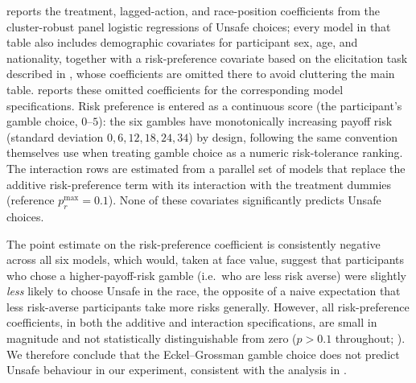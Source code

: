 \documentclass[pdflatex,sn-mathphys-ay]{sn-jnl}
\theoremstyle{thmstyleone}
\theoremstyle{thmstyletwo}
\theoremstyle{thmstylethree}
\begin{document}
 reports the treatment, lagged-action, and race-position coefficients from the cluster-robust panel logistic regressions of Unsafe choices; every model in that table also includes demographic covariates for participant sex, age, and nationality, together with a risk-preference covariate based on the \cite{eckel2008forecastingRiskAttitudes} elicitation task described in , whose coefficients are omitted there to avoid cluttering the main table.  reports these omitted coefficients for the corresponding model specifications. Risk preference is entered as a continuous score (the participant's gamble choice, \(0\)--\(5\)): the six gambles have monotonically increasing payoff risk (standard deviation \(0,6,12,18,24,34\)) by design, following the same convention \cite{eckel2008forecastingRiskAttitudes} themselves use when treating gamble choice as a numeric risk-tolerance ranking. The interaction rows are estimated from a parallel set of models that replace the additive risk-preference term with its interaction with the treatment dummies (reference \(p_r^{\max}=0.1\)). None of these covariates significantly predicts Unsafe choices.

The point estimate on the risk-preference coefficient is consistently negative across all six models, which would, taken at face value, suggest that participants who chose a higher-payoff-risk gamble (i.e.\ who are less risk averse) were slightly \emph{less} likely to choose Unsafe in the race, the opposite of a naive expectation that less risk-averse participants take more risks generally. However, all risk-preference coefficients, in both the additive and interaction specifications, are small in magnitude and not statistically distinguishable from zero (\(p>0.1\) throughout; ). We therefore conclude that the Eckel--Grossman gamble choice does not predict Unsafe behaviour in our experiment, consistent with the analysis in .
\end{document}

